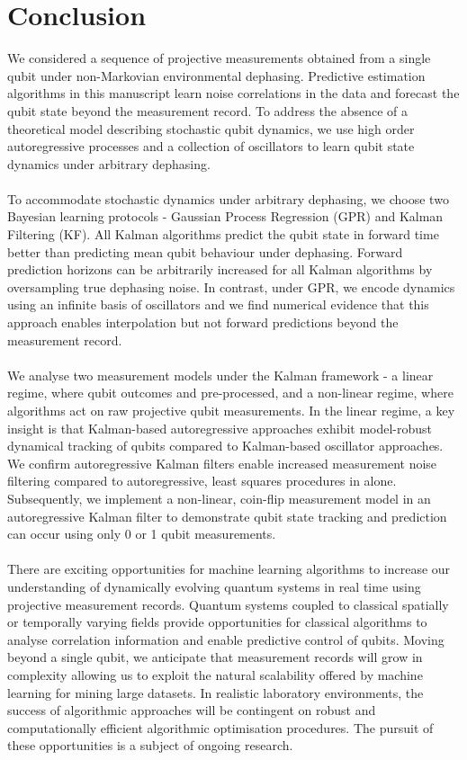 \section{Conclusion \label{sec:main:Conclusion}}

We considered a sequence of projective measurements obtained from a single qubit under non-Markovian environmental dephasing. Predictive estimation algorithms in this manuscript learn noise correlations in the data and forecast the qubit state beyond the measurement record. To address the absence of a theoretical model describing stochastic qubit dynamics, we use high order autoregressive processes and a collection of oscillators to learn qubit state dynamics under arbitrary dephasing. 
\\
\\
To accommodate stochastic dynamics under arbitrary dephasing, we choose two Bayesian learning protocols - Gaussian Process Regression (GPR) and Kalman Filtering (KF).  All Kalman algorithms predict the qubit state in forward time better than predicting mean qubit behaviour under dephasing.  Forward prediction horizons can be arbitrarily increased for all Kalman algorithms by oversampling true dephasing noise.  In contrast, under GPR, we encode dynamics using an infinite basis of oscillators and we find numerical evidence that this approach enables interpolation but not forward predictions beyond the measurement record.  
\\
\\
We analyse two measurement models under the Kalman framework - a linear regime, where qubit outcomes and pre-processed, and a non-linear regime, where algorithms act on raw projective qubit measurements. In the linear regime, a key insight is that Kalman-based autoregressive approaches exhibit model-robust dynamical tracking of qubits compared to Kalman-based oscillator approaches. We confirm autoregressive Kalman filters enable increased measurement noise filtering compared to autoregressive, least squares procedures in \cite{mavadia2017} alone. Subsequently, we implement a non-linear, coin-flip measurement model in an autoregressive Kalman filter to demonstrate qubit state tracking and prediction can occur using only 0 or 1 qubit measurements. 
\\
\\
There are exciting opportunities for machine learning algorithms to increase our understanding of dynamically evolving quantum systems in real time using  projective measurement records. Quantum systems coupled to classical spatially or temporally varying fields provide opportunities for classical algorithms to analyse correlation information and enable predictive control of qubits. Moving beyond a single qubit, we anticipate that measurement records will grow in complexity allowing us to exploit the natural scalability offered by machine learning for mining large datasets. In realistic laboratory environments, the success of algorithmic approaches will be contingent on robust and computationally efficient algorithmic optimisation procedures. The pursuit of these opportunities is a subject of ongoing research.

